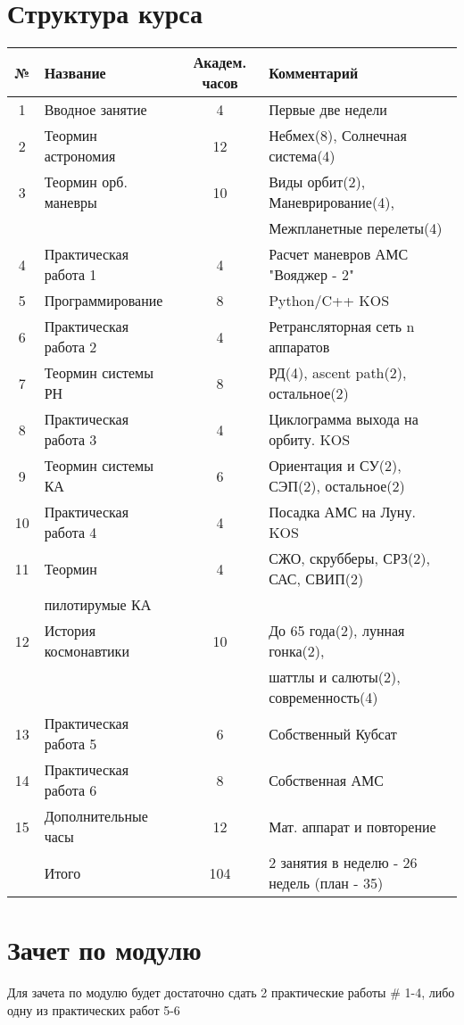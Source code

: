 \documentclass{article}
\begin{document}
\section{Структура курса}
\begin{tabular}{ | c | l | c | l | }
\hline
№ & Название & Академ. часов & Комментарий  \\ \hline
1 & Вводное занятие & 4 & Первые две недели \\ \hline
2 & Теормин астрономия & 12 & Небмех(8), Солнечная система(4)  \\ \hline
3 & Теормин орб. маневры & 10 & Виды орбит(2), Маневрирование(4),   \\
& & & Межпланетные перелеты(4) \\ \hline
4 & Практическая работа 1 & 4 & Расчет маневров АМС "Вояджер - 2" \\ \hline
5 & Программирование & 8 & Python/C++ KOS \\ \hline
6 & Практическая работа 2 & 4 & Ретрансляторная сеть n аппаратов \\ \hline
7 & Теормин системы РН & 8 & РД(4), ascent path(2), остальное(2) \\  \hline
8 & Практическая работа 3 & 4 & Циклограмма выхода на орбиту. KOS \\ \hline
9 & Теормин системы КА & 6 & Ориентация и СУ(2), СЭП(2), остальное(2) \\ \hline
10 & Практическая работа 4 & 4 & Посадка АМС на Луну. KOS \\ \hline
11 & Теормин & 4 & СЖО, скрубберы, СРЗ(2), САС, СВИП(2) \\
& пилотирумые КА & &  \\ \hline
12 & История космонавтики & 10 & До 65 года(2), лунная гонка(2),  \\
& & & шаттлы и салюты(2), современность(4) \\ \hline
13 & Практическая работа 5 & 6 & Собственный Кубсат \\ \hline
14 & Практическая работа 6 & 8 & Собственная АМС \\ \hline
15 & Дополнительные часы & 12 & Мат. аппарат и повторение \\ \hline 
\hline & Итого & 104 & 2 занятия в неделю - 26 недель (план - 35)\\  \hline
\end{tabular}

\section{Зачет по модулю}
Для зачета по модулю будет достаточно сдать 2 практические работы # 1-4, либо одну из практических работ 5-6
\end{document}
